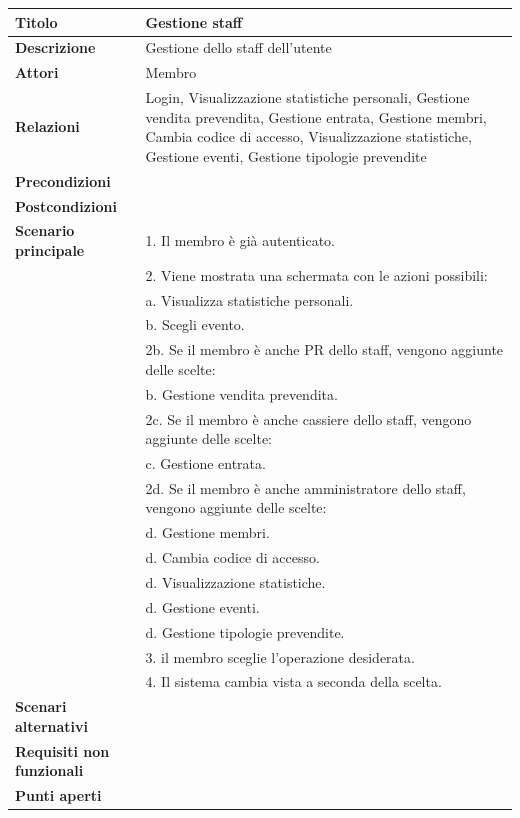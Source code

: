 \documentclass[a4paper]{article}
\begin{document}
\begin{center}
\begin{tabularx}{1\textwidth}{|l|X|}
    \hline
	\textbf{Titolo} & Gestione staff \\
	\hline
	\textbf{Descrizione} & Gestione dello staff dell'utente \\
	\hline
	\textbf{Attori} & Membro \\
	\hline
	\textbf{Relazioni} & Login, Visualizzazione statistiche personali, Gestione vendita prevendita, Gestione entrata, Gestione membri, Cambia codice di accesso, Visualizzazione statistiche, Gestione eventi, Gestione tipologie prevendite \\
	\hline
	\textbf{Precondizioni} & \\
	\hline
	\textbf{Postcondizioni} & \\
	\hline
	\textbf{Scenario principale} & 1. Il membro è già autenticato.\\
	                             & 2. Viene mostrata una schermata con le azioni possibili:\\
								 & \quad a. Visualizza statistiche personali.\\
								 & \quad b. Scegli evento.\\
								 & 2b. Se il membro è anche PR dello staff, vengono aggiunte delle scelte:\\
								 & \quad b. Gestione vendita prevendita.\\
								 & 2c. Se il membro è anche cassiere dello staff, vengono aggiunte delle scelte:\\
								 & \quad c. Gestione entrata.\\
								 & 2d. Se il membro è anche amministratore dello staff, vengono aggiunte delle scelte:\\
								 & \quad d. Gestione membri.\\
								 & \quad d. Cambia codice di accesso.\\
								 & \quad d. Visualizzazione statistiche.\\
								 & \quad d. Gestione eventi.\\
								 & \quad d. Gestione tipologie prevendite.\\
								 & 3. il membro sceglie l'operazione desiderata.\\
								 & 4. Il sistema cambia vista a seconda della scelta.\\
	\hline
	\textbf{Scenari alternativi} & \\
	\hline
	\textbf{Requisiti non funzionali} & \\
	\hline
	\textbf{Punti aperti} & \\
	\hline
\end{tabularx}
\end{center}
  
\end{document}
